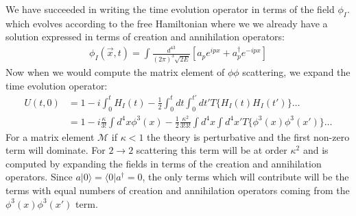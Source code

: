 We have succeeded in writing the time evolution operator in terms of the field $\phi_I$. which evolves according to the free Hamiltonian 
where we we already have a solution expressed in terms of creation and annihilation operators:
\begin{align*}
\phi_I(\vec x, t) = \int \frac{d^43}{(2\pi)^3\sqrt{2E}} \left [  a_p e^{ipx} + a_p^\dagger e^{-ipx} \right ]
\end{align*}
Now when we would compute the matrix element of $\phi\phi$ scattering, we expand the time evolution operator:
\begin{align*}
U(t,0) &= 1 - i \int_0^t H_I(t)  - \frac{1}{2} \int_0^t dt \int_0^{t'} dt' T\{ H_I(t) H_I(t')\} \ldots \\
&= 1 - i \frac{\kappa}{3!}\int d^4x \phi^3(x)  - \frac{1}{2} \frac{\kappa^2}{3!3!} \int d^4x \int d^4x' T \{ \phi^3(x) \phi^3(x') \}  \ldots 
\end{align*}
For a matrix element $\mathcal{M}$ if $\kappa<1$ the theory is perturbative and the first non-zero term
will dominate. For $2\rightarrow 2$ scattering this 
term will be at order $\kappa^2$ and is computed by expanding the fields in terms
of the creation and annihilation operators. Since $a|0\rangle = \langle 0 | a^\dagger = 0$, the only terms which will contribute will be the terms with equal numbers of creation and annihilation operators coming from the $\phi^3(x)\phi^3(x')$ term. 

